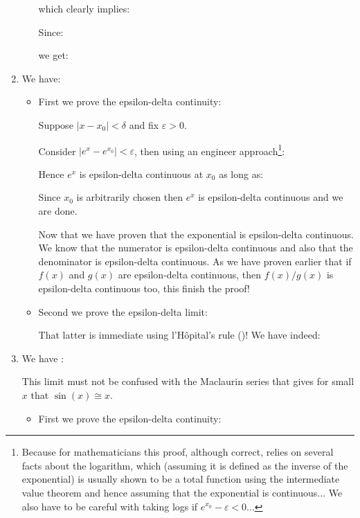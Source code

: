 \begin{enumerate}
\begin{itemize}
			which clearly implies:
			
			Since:
			
			we get:
			
		\end{itemize}
		
		\item We have:
		

		\begin{itemize}
			\item First we prove the epsilon-delta continuity:
			
			Suppose $\left|x-x_0\right|<\delta$ and fix $\varepsilon>0$.
			
			Consider $\left|e^x-e^{x_0}\right|<\varepsilon$, then using an engineer approach\footnote{Because for mathematicians this proof, although correct, relies on several facts about the logarithm, which (assuming it is defined as the inverse of the exponential) is usually shown to be a total function using the intermediate value theorem and hence assuming that the exponential is continuous... We also have to be careful with taking logs if $e^{x_0}-\varepsilon<0$...}:
			
			Hence $e^x$ is epsilon-delta continuous at $x_0$ as long as:
			
			Since $x_0$ is arbitrarily chosen then $e^x$ is epsilon-delta continuous and we are done.
			
			Now that we have proven that the exponential is epsilon-delta continuous. We know that the numerator is epsilon-delta continuous and also that the denominator is epsilon-delta continuous. As we have proven earlier that if $f(x)$ and $g(x)$ are epsilon-delta continuous, then $f(x)/g(x)$ is epsilon-delta continuous too, this finish the proof!
			
			\item Second we prove the epsilon-delta limit:
			
			That latter is immediate using l'Hôpital's rule ()! We have indeed:
			
			
		\end{itemize}
		
		\item We have :
		
		
		This limit must not be confused with the Maclaurin series that gives for small $x$ that $\sin(x)\cong x$.
		
		\begin{itemize}
			\item First we prove the epsilon-delta continuity:
			

\end{itemize}
\end{enumerate}
